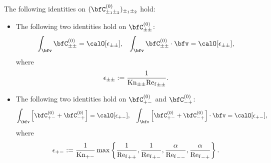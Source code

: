     \begin{lemma}\label{lem:phase-restricted conservation on local collision operators}
        The following identities on $(\bfC_{\pm_{1}\pm_{2}}^{(0)})_{\pm_{1}\pm_{2}}$ hold:
        \begin{itemize}
            \item  The following two identities hold on $\bfC_{\pm\pm}^{(0)}$:
            \begin{align}
                \int_{\bfv}\bfC_{\pm\pm}^{(0)}           =  \calO[\epsilon_{\pm\pm}],  &&
                \int_{\bfv}\bfC_{\pm\pm}^{(0)}\cdot\bfv  =  \calO[\epsilon_{\pm\pm}],
            \end{align}
            where
            \begin{equation}
                \epsilon_{\pm\pm}  :=  \frac{1}{\mathrm{Kn}_{\pm\pm}{\mathrm{Re}_{\mathrm{f}}}_{\pm\pm}}.
            \end{equation}
            \item  The following two identities hold on $\bfC_{+-}^{(0)}$ and $\bfC_{-+}^{(0)}$:
            \begin{align}
                \int_{\bfv}\left[\bfC_{+-}^{(0)} + \bfC_{-+}^{(0)}\right]           =  \calO[\epsilon_{+-}],  &&
                \int_{\bfv}\left[\bfC_{+-}^{(0)} + \bfC_{-+}^{(0)}\right]\cdot\bfv  =  \calO[\epsilon_{+-}],
            \end{align}
            where
            \begin{equation}
                \epsilon_{+-}  :=  \frac{1}{\mathrm{Kn}_{+-}}\max\left\{\frac{1}{{\mathrm{Re}_{\mathrm{f}}}_{++}}, \frac{1}{{\mathrm{Re}_{\mathrm{f}}}_{+-}}, \frac{\alpha}{{\mathrm{Re}_{\mathrm{f}}}_{--}}, \frac{\alpha}{{\mathrm{Re}_{\mathrm{f}}}_{-+}}\right\}.
            \end{equation}
        \end{itemize}
    \end{lemma}
